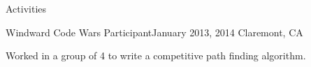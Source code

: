 \documentclass{resume} %
\begin{document}

\vspace{-2mm}

\begin{rSection}{Activities}


\begin{rSubsection}{Windward Code Wars Participant}{January 2013, 2014}{ }{Claremont, CA}
\item Worked in a group of 4 to write a competitive path finding algorithm. 

\end{rSubsection}

%
%
%


\end{rSection}
\end{document}
